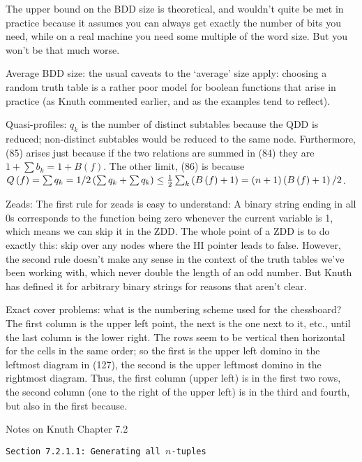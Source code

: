 \noindent [p 234] The upper bound on the BDD size is theoretical,
and wouldn't quite be met in practice because it assumes you
can always get exactly the number of bits you need, while
on a real machine you need some multiple of the word size.
But you won't be that much worse.

\vskip 0.08in \noindent [p 234] Average BDD size: the usual
caveats to the `average' size apply: choosing a random truth
table is a rather poor model for boolean functions that arise
in practice (as Knuth commented earlier, and as the examples
tend to reflect).

\vskip 0.08in \noindent [p 235] Quasi-profiles: $q_k$ is the
number of distinct subtables because the QDD is reduced;
non-distinct subtables would be reduced to the same node.
Furthermore, (85)  arises just because if the two relations
are summed in (84) they are $1 + \sum b_k = 1 + B\left(f\right)$.
The other limit, (86) is because
$Q\left(f\right) = \sum q_k =
1/2 \left(\sum q_k + \sum q_k\right)
\le {1 \over 2} \sum_k \left(B\left(f\right) + 1\right) = \left(n + 1\right)
\left(B\left(f\right) + 1\right) / 2$.

\vskip 0.08in 

\noindent [p 250] Zeads: The first rule for zeads is easy to 
understand: A binary string ending in all 0s corresponds to
the function being zero whenever the current variable is 1, which 
means we can skip it in the ZDD.  The whole point of a ZDD
is to do exactly this: skip over any nodes where the HI pointer
leads to false.  However, the second rule doesn't
make any sense in the context of the truth tables we've been working
with, which never double the length of an odd number.  But Knuth
has defined it for arbitrary binary strings for reasons that aren't
clear.

\vskip 0.08in \noindent [p 251] Exact cover problems: what is
the numbering scheme used for the chessboard?  The first
column is the upper left point, the next is the one next to it, etc.,
until the last column is the lower right.  The rows seem to be
vertical then horizontal for the cells in the same order;
so the first is the upper left domino in the leftmost diagram in (127),
the second is the upper leftmost domino in the rightmost
diagram.  Thus, the first column (upper left) is in the first two rows,
the second column (one to the right of the upper left) is
in the third and fourth, but also in the first because.


\vfil\break
\topglue 0.5in
\centerline{Notes on Knuth Chapter 7.2}
\vskip 0.3in
\centerline {\tt Section 7.2.1.1: Generating all $n$-tuples}
\vskip 0.2in

